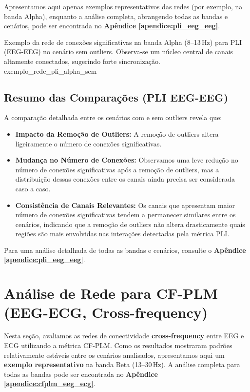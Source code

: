 Apresentamos aqui apenas exemplos representativos das redes (por exemplo, na banda Alpha), enquanto a análise completa, abrangendo todas as bandas e cenários, pode ser encontrada no \textbf{Apêndice \ref{apendice:pli_eeg_eeg}}.

{Exemplo da rede de conexões significativas na banda Alpha (8--13\,Hz) para PLI (EEG-EEG) no cenário sem outliers. Observa-se um núcleo central de canais altamente conectados, sugerindo forte sincronização.}
{exemplo_rede_pli_alpha_sem}


\subsection{Resumo das Comparações (PLI EEG-EEG)}

A comparação detalhada entre os cenários com e sem outliers revela que:
\begin{itemize}
    \item \textbf{Impacto da Remoção de Outliers:} A remoção de outliers altera ligeiramente o número de conexões significativas.
    \item \textbf{Mudança no Número de Conexões:} Observamos uma leve redução no número de conexões significativas após a remoção de outliers, mas a distribuição dessas conexões entre os canais ainda precisa ser considerada caso a caso.
    \item \textbf{Consistência de Canais Relevantes:} Os canais que apresentam maior número de conexões significativas tendem a permanecer similares entre os cenários, indicando que a remoção de outliers não altera drasticamente quais regiões são mais envolvidas nas interações detectadas pela métrica PLI.
\end{itemize}

Para uma análise detalhada de todas as bandas e cenários, consulte o \textbf{Apêndice \ref{apendice:pli_eeg_eeg}}. 

\section{Análise de Rede para CF-PLM (EEG-ECG, Cross-frequency)}
\label{sec:rede_cfplm_eeg_ecg}

Nesta seção, avaliamos as redes de conectividade \textbf{cross-frequency} entre EEG e ECG utilizando a métrica CF-PLM. Como os resultados mostraram padrões relativamente estáveis entre os cenários analisados, apresentamos aqui um \textbf{exemplo representativo} na banda Beta (13--30\,Hz). A análise completa para todas as bandas pode ser encontrada no \textbf{Apêndice \ref{apendice:cfplm_eeg_ecg}}.

